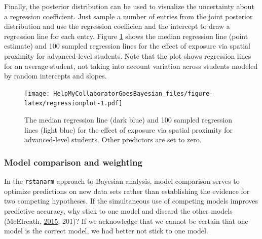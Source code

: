 \documentclass[doc]{apa6}
\newenvironment{Shaded}{\begin{snugshade}}{\end{snugshade}}
\newcommand{\KeywordTok}[1]{\textcolor[rgb]{0.13,0.29,0.53}{\textbf{#1}}}
\newcommand{\DataTypeTok}[1]{\textcolor[rgb]{0.13,0.29,0.53}{#1}}
\newcommand{\DecValTok}[1]{\textcolor[rgb]{0.00,0.00,0.81}{#1}}
\newcommand{\StringTok}[1]{\textcolor[rgb]{0.31,0.60,0.02}{#1}}
\newcommand{\OperatorTok}[1]{\textcolor[rgb]{0.81,0.36,0.00}{\textbf{#1}}}
\newcommand{\NormalTok}[1]{#1}
\begin{document}
\begin{Shaded}
\end{Shaded}

Finally, the posterior distribution can be used to visualize the
uncertainty about a regression coefficient. Just sample a number of
entries from the joint posterior distribution and use the regression
coefficien and the intercept to draw a regression line for each entry.
Figure \ref{fig:regressionplot} shows the median regression line (point
estimate) and 100 sampled regression lines for the effect of exposure
via spatial proximity for advanced-level students. Note that the plot
shows regression lines for an average student, not taking into account
variation across students modeled by random intercepts and slopes.

\begin{figure}
\centering
\texttt{[image: HelpMyCollaboratorGoesBayesian\_files/figure-latex/regressionplot-1.pdf]}
\caption{\label{fig:regressionplot}The median regression line (dark blue)
and 100 sampled regression lines (light blue) for the effect of exposure
via spatial proximity for advanced-level students. Other predictors are
set to zero.}
\end{figure}

\subsubsection{Model comparison and
weighting}\label{model-comparison-and-weighting}

In the \texttt{rstanarm} approach to Bayesian analysis, model comparison
serves to optimize predictions on new data sets rather than establishing
the evidence for two competing hypotheses. If the simultaneous use of
competing models improves predictive accuracy, why stick to one model
and discard the other models (McElreath,
\protect\hyperlink{ref-McElreathStatisticalRethinkingBayesian2015}{2015}:
201)? If we acknowledge that we cannot be certain that one model is the
correct model, we had better not stick to one model.
\end{document}
